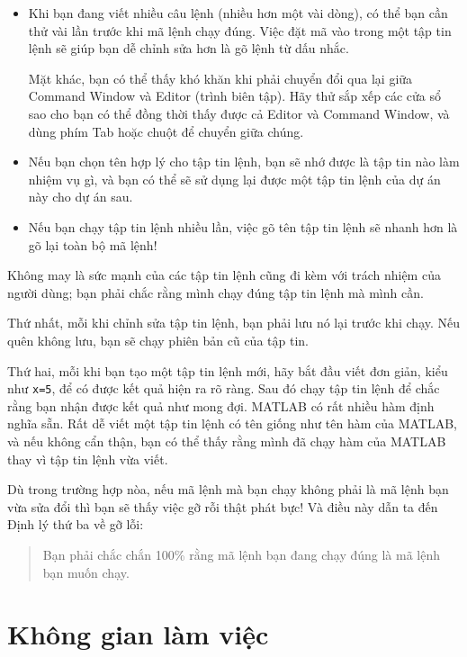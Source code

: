 \documentclass[12pt]{book}
\begin{document}
\begin{itemize}

\item Khi bạn đang viết nhiều câu lệnh (nhiều hơn một vài dòng), có thể
bạn cần thử vài lần trước khi mã lệnh chạy đúng. Việc đặt mã vào trong
một tập tin lệnh sẽ giúp bạn dễ chỉnh sửa hơn là gõ lệnh từ dấu nhắc.

Mặt khác, bạn có thể thấy khó khăn khi phải chuyển đổi qua lại giữa 
Command Window và Editor (trình biên tập). Hãy thử sắp xếp các cửa sổ
sao cho bạn có thể đồng thời thấy được cả Editor và Command Window,
và dùng phím Tab hoặc chuột để chuyển giữa chúng.

\item Nếu bạn chọn tên hợp lý cho tập tin lệnh, bạn sẽ nhớ được là
tập tin nào làm nhiệm vụ gì, và bạn có thể sẽ sử dụng lại được một
tập tin lệnh của dự án này cho dự án sau.

\item Nếu bạn chạy tập tin lệnh nhiều lần, việc gõ tên tập tin lệnh sẽ 
nhanh hơn là gõ lại toàn bộ mã lệnh!

\end{itemize}

Không may là sức mạnh của các tập tin lệnh cũng đi kèm với trách nhiệm
của người dùng; bạn phải chắc rằng mình chạy đúng tập tin lệnh mà
mình cần.

Thứ nhất, mỗi khi chỉnh sửa tập tin lệnh, bạn phải lưu nó lại trước khi 
chạy. Nếu quên không lưu, bạn sẽ chạy phiên bản cũ của tập tin.

Thứ hai, mỗi khi bạn tạo một tập tin lệnh mới, hãy bắt đầu viết 
đơn giản, kiểu như {\tt x=5}, để có được kết quả hiện ra rõ ràng. Sau đó
chạy tập tin lệnh để chắc rằng bạn nhận được kết quả như mong đợi.
MATLAB có rất nhiều hàm định nghĩa sẵn. Rất dễ viết một tập tin lệnh
có tên giống như tên hàm của MATLAB, và nếu không cẩn thận, bạn
có thể thấy rằng mình đã chạy hàm của MATLAB thay vì tập tin lệnh
vừa viết.

Dù trong trường hợp nòa, nếu mã lệnh mà bạn chạy không phải là mã
lệnh bạn vừa sửa đổi thì bạn sẽ thấy việc gỡ rỗi thật phát bực! Và 
điều này dẫn ta đến Định lý thứ ba về gỡ lỗi:

\begin{quote}
Bạn phải chắc chắn 100\% rằng mã lệnh bạn đang chạy đúng là
mã lệnh bạn muốn chạy.
\end{quote}



\section{Không gian làm việc}
\end{document}
